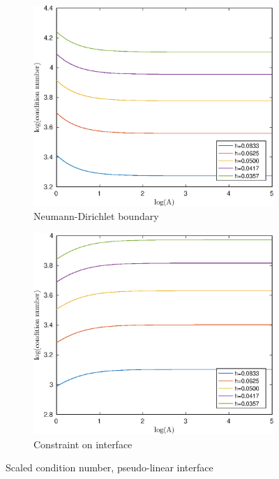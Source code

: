 \documentclass[12pt]{article}
\begin{document}
\begin{figure}[h!]
\begin{subfigure}{0.4\textwidth}
\end{subfigure}
\vfill
\begin{subfigure}{0.4\textwidth}
\includegraphics[width=\textwidth]{cond-A-2D-plinear-ND}
\caption{Neumann-Dirichlet boundary}
\end{subfigure}
\hfill
\begin{subfigure}{0.4\textwidth}
\includegraphics[width=\textwidth]{cond-A-2D-plinear-interface}
\caption{Constraint on interface}
\end{subfigure}
\caption{Scaled condition number, pseudo-linear interface}
\end{figure} 
\end{document}
